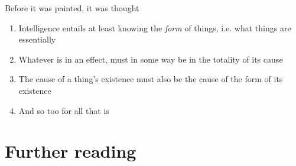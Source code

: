 \documentclass[xcolor=dvipsnames]{beamer}
\begin{document}
\begin{frame}[fragile]{Before it was painted, it was thought}
  \begin{enumerate}
  \item Intelligence entails at least knowing the \emph{form} of things, i.e. what things are essentially \vspace{5mm}
  \item Whatever is in an effect, must in some way be in the totality of its cause \vspace{5mm}
  \item The cause of a thing's existence must also be the cause of the form of its existence \vspace{5mm}
  \item And so too for all that is \vspace{5mm}
  \end{enumerate}
\end{frame}


\section{Further reading}
\end{document}
